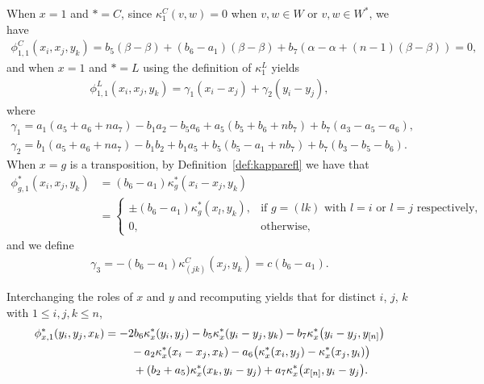 \documentclass[pdftex]{sigma}
\numberwithin{equation}{section}
\begin{document}
When $x=1$ and $*=C$, since $\kappa^C_1(v,w)=0$ when $v,w \in W$ or $v,w \in W^*$, we have
\begin{gather*}
\phi_{1,1}^C(x_i,x_j,y_k)=b_5(\beta-\beta)+(b_6-a_1)(\beta-\beta) +b_7\left(\alpha-\alpha+(n-1)(\beta-\beta)\right)=0,
\end{gather*}
and when $x=1$ and $*=L$ using the definition of $\kappa^L_1$ yields
\begin{gather*}
\phi_{1,1}^L(x_i,x_j,y_k)=\gamma_1(x_i-x_j)+\gamma_2(y_i-y_j),
\end{gather*}
where
\begin{gather*}
\gamma_1=a_1(a_5 + a_6 + na_7) - b_1 a_2 - b_5 a_6 + a_5 (b_5 + b_6 + nb_7) + b_7 (a_3 - a_5 - a_6),
\\
\gamma_2=b_1(a_5 + a_6 + na_7) - b_1 b_2 + b_1 a_5 + b_5 (b_5 - a_1 + nb_7) + b_7 (b_3 - b_5 - b_6).
\end{gather*}
When $x=g$ is a transposition, by Definition~\ref{def:kapparefl} we have
that
\begin{align*}
\phi_{g,1}^*(x_i,x_j,y_k)&=(b_6 - a_1)\kappa^*_g(x_i-x_j,y_k) \\
&=
\begin{cases}
 \pm(b_6 - a_1)\kappa^*_g(x_l,y_k), & \text{if\ \ $g=(lk)$\ \ with\ \ $l=i$\ \ or\ \ $l=j$\ \ respectively}, \\
 0, & \text{otherwise},
\end{cases}
\end{align*}
and we define
\begin{gather*}
\gamma_3=-(b_6 - a_1)\kappa_{(jk)}^C(x_j,y_k)=c(b_6 - a_1).
\end{gather*}

Interchanging the roles of $x$ and $y$ and recomputing yields that for
distinct $i$, $j$, $k$ with $1 \leq i, j, k \leq n$,
\begin{gather*}
\phi_{x,1}^*(y_i,y_j,x_k)
=-2b_6 \kappa^*_x(y_i,y_j) - b_5 \kappa^*_x(y_i-y_j,y_k) - b_7 \kappa^*_x\big(y_i-y_j,y_{[n]}\big)
\\ \hphantom{\phi_{x,1}^*(y_i,y_j,x_k)=}
{}- a_2 \kappa^*_x(x_i-x_j,x_k)-a_6\big(\kappa^*_x(x_i,y_j) - \kappa^*_x(x_j,y_i)\big)
\\ \hphantom{\phi_{x,1}^*(y_i,y_j,x_k)=}
{}+(b_2 + a_5)\kappa^*_x(x_k,y_i-y_j) + a_7 \kappa^*_x\big(x_{[n]},y_i-y_j\big).
\end{gather*}
\end{document}
